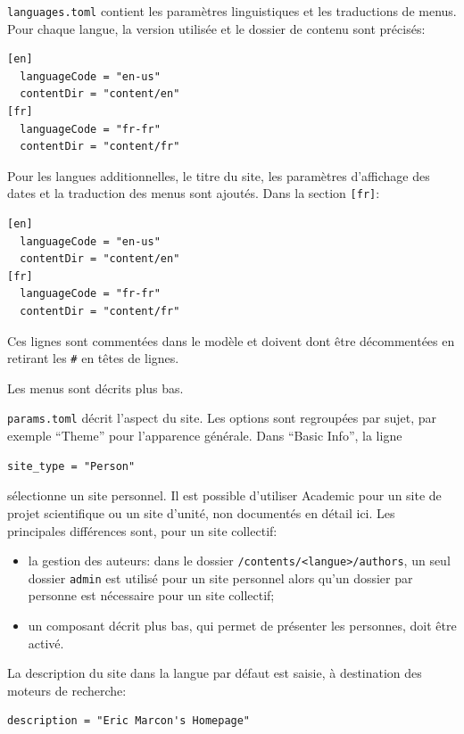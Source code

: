 \documentclass[
  11pt,
  french,
  a4paper,
  extrafontsizes,onecolumn,openright
  ]{memoir}
\providecommand{\tightlist}{%
  \setlength{\itemsep}{0pt}\setlength{\parskip}{0pt}}
\begin{document}
\texttt{languages.toml} contient les paramètres linguistiques et les traductions de menus.
Pour chaque langue, la version utilisée et le dossier de contenu sont précisés:

\begin{verbatim}
[en]
  languageCode = "en-us"
  contentDir = "content/en"
[fr]
  languageCode = "fr-fr"
  contentDir = "content/fr"
\end{verbatim}

Pour les langues additionnelles, le titre du site, les paramètres d'affichage des dates et la traduction des menus sont ajoutés.
Dans la section \texttt{{[}fr{]}}:

\begin{verbatim}
[en]
  languageCode = "en-us"
  contentDir = "content/en"
[fr]
  languageCode = "fr-fr"
  contentDir = "content/fr"
\end{verbatim}

Ces lignes sont commentées dans le modèle et doivent dont être décommentées en retirant les \texttt{\#} en têtes de lignes.

Les menus sont décrits plus bas.

\texttt{params.toml} décrit l'aspect du site.
Les options sont regroupées par sujet, par exemple ``Theme'' pour l'apparence générale.
Dans ``Basic Info'', la ligne

\begin{verbatim}
site_type = "Person"
\end{verbatim}

sélectionne un site personnel.
Il est possible d'utiliser Academic pour un site de projet scientifique ou un site d'unité, non documentés en détail ici.
Les principales différences sont, pour un site collectif:

\begin{itemize}
\tightlist
\item
  la gestion des auteurs: dans le dossier \texttt{/contents/\textless{}langue\textgreater{}/}\break\texttt{authors}, un seul dossier \texttt{admin} est utilisé pour un site personnel alors qu'un dossier par personne est nécessaire pour un site collectif;
\item
  un composant décrit plus bas, qui permet de présenter les personnes, doit être activé.
\end{itemize}

La description du site dans la langue par défaut est saisie, à destination des moteurs de recherche:

\begin{verbatim}
description = "Eric Marcon's Homepage"
\end{verbatim}
\end{document}
